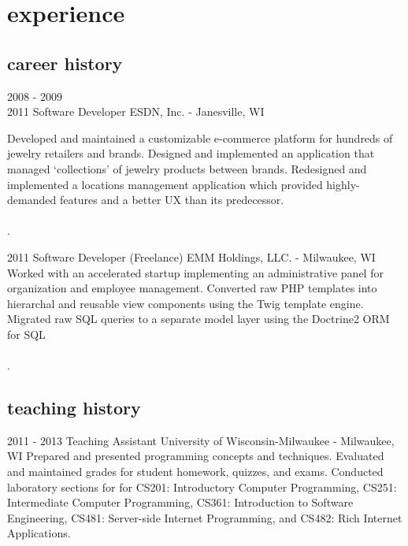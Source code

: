 \documentclass[]{fritz-resume}
\begin{document}

\section{experience}

\subsection{career history}

\begin{entrylist}
	\entry
		{2008 - 2009 \\ 2011}
		{Software Developer}
		{ESDN, Inc. - Janesville, WI}
		{
			Developed and maintained a customizable e-commerce platform for hundreds of jewelry retailers and brands. Designed and implemented an application that managed `collections' of jewelry products between brands. Redesigned and implemented a locations management application which provided highly-demanded features and a better UX than its predecessor. \\\\ .
			
		}
	
	\entry
		{2011}
		{Software Developer (Freelance)}
		{EMM Holdings, LLC. - Milwaukee, WI}
		{
			Worked with an accelerated startup implementing an administrative panel for organization and employee management. Converted raw PHP templates into hierarchal and reusable view components using the Twig template engine. Migrated raw SQL queries to a separate model layer using the Doctrine2 ORM for SQL\\\\ .
		}
\end{entrylist}

\subsection{teaching history}

\begin{entrylist}
	\entry
		{2011 - 2013}
		{Teaching Assistant}
		{University of Wisconsin-Milwaukee - Milwaukee, WI}
		{
			Prepared and presented programming concepts and techniques. Evaluated and maintained grades for student homework, quizzes, and exams. Conducted laboratory sections for for CS201: Introductory Computer Programming, CS251: Intermediate Computer Programming, CS361: Introduction to Software Engineering, CS481: Server-side Internet Programming, and CS482: Rich Internet Applications. 
		}
\end{entrylist}
\end{document}
